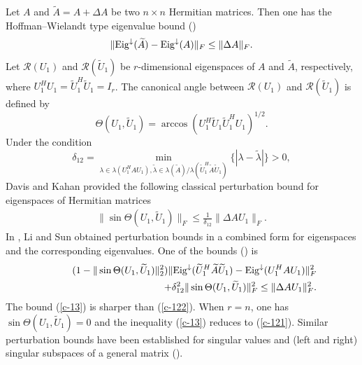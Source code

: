 \documentclass[11pt,a4paper]{article}
\numberwithin{equation}{section}
\newcommand {\wt} {\widetilde}
\begin{document}
Let $A$ and $\wt A=A+\Delta A$ be two $n\times n$ Hermitian matrices. Then one has the
Hoffman--Wielandt type eigenvalue bound (\cite{bh96,golv13,ss90})
\begin{eqnarray}\label{c-121}
\|{\rm Eig}^{\downarrow}(\wt A)-{\rm Eig}^{\downarrow}(A)\|_F\leq \|\Delta A\|_F.
\end{eqnarray}
Let $\mathcal{R}(U_1)$ and $\mathcal{R}(\wt U_1)$ be $r$-dimensional eigenspaces of $A$ and $\wt A$, respectively, where $U_1^HU_1=\wt U_1^H\wt U_1=I_r$.
The canonical angle between $\mathcal{R}(U_1)$ and $\mathcal{R}(\wt U_1)$ is defined by
$$
\Theta(U_1,\wt U_1)=\arccos(U_1^H\wt U_1\wt U_1^HU_1)^{1/2}.
$$
Under the condition
\[
\delta_{12}=\min_{\lambda\in\lambda(U_1^HAU_1), \wt\lambda\in\lambda(\wt A)/\lambda(\wt U_1^H\wt A\wt U_1)}\{|\lambda-\wt \lambda|\}>0,
\]
Davis and Kahan \cite{dk70} provided the following classical perturbation bound for eigenspaces of Hermitian matrices
\begin{eqnarray}\label{c-122}
\|\sin\Theta(U_1,\wt U_1)\|_F\leq \frac{1}{\delta_{12}}\|\Delta A U_1\|_F.
\end{eqnarray}
In \cite{li07}, Li and Sun  obtained perturbation bounds
in a combined form for eigenspaces and the corresponding eigenvalues.
One of the bounds %
 (\cite[Theorem 2.2]{li07}) is
\begin{eqnarray}\label{c-13}
&&\quad(1-\|\sin\Theta(U_1,\wt U_1)\|_2^2)\|{\rm Eig}^{\downarrow}(\wt U_1^H \wt A \wt U_1)-{\rm Eig}^{\downarrow}(U_1^HAU_1)\|_F^2\nonumber\\
&&\qquad\qquad\qquad\qquad \qquad\quad +\delta^2_{12}\|\sin\Theta(U_1,\wt U_1)\|_F^2
\leq \|\Delta A U_1\|_F^2.
\end{eqnarray}
The bound (\ref{c-13}) is sharper than (\ref{c-122}). When $r=n$, one has
 $\sin\Theta(U_1, \wt U_1)=0$ and the inequality (\ref{c-13}) reduces to (\ref{c-121}). Similar perturbation bounds have been established for singular values and (left and right) singular subspaces of a general matrix   (\cite{li98a,li98, li07,ss90,w72}).  \vskip 0.1in
\end{document}
